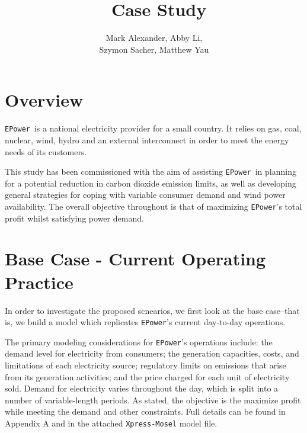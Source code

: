 \documentclass{article}
\title{\Huge \EPower\ Case Study}
\author{Mark Alexander, Abby Li,\\[0.2cm]Szymon Sacher, Matthew Yau}
\newcommand{\EPower}{\texttt{EPower}}
\begin{document}
	\begin{titlepage}

	\maketitle
    
    \end{titlepage}
    
    
    \section{Overview}
    
    \EPower\ is a national electricity provider for a small country.  It relies on gas, coal, nuclear, wind, hydro and an external interconnect in order to meet the energy needs of its customers.
    
    This study has been commissioned with the aim of assisting \EPower\ in planning for a potential reduction in carbon dioxide emission limits, as well as developing general strategies for coping with variable consumer demand and wind power availability.  The overall objective throughout is that of maximizing \EPower's total profit whilst satisfying power demand.
    
    
    
    \section{Base Case - Current Operating Practice}
	
    In order to investigate the proposed scnearios, we first look at the base case--that is, we build a model which replicates \EPower's current day-to-day operations.
    
    The primary modeling considerations for \EPower's operations include: the demand level for electricity from consumers; the generation capacities, costs, and limitations of each electricity source; regulatory limits on emissions that arise from its generation activities; and the price charged for each unit of electricity sold.  Demand for electricity varies throughout the day, which is split into a number of variable-length periods.  As stated, the objective is the maximize profit while meeting the demand and other constraints. Full details can be found in Appendix A and in the attached \texttt{Xpress-Mosel} model file.
    
\end{document}
